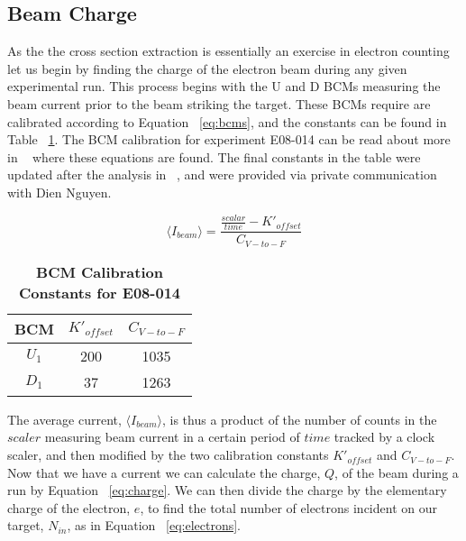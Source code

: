 \subsection{Beam Charge}
\label{ssec:charge}

As the the cross section extraction is essentially an exercise in electron counting let us begin by finding the charge of the electron beam during any given experimental run. This process begins with the U and D BCMs measuring the beam current prior to the beam striking the target. These BCMs require are calibrated according to Equation ~\ref{eq:bcms}, and the constants can be found in Table ~\ref{tab:bcm_constants}. The BCM calibration for experiment E08-014 can be read about more in ~\cite{bcm_calibration} where these equations are found. The final constants in the table were updated after the analysis in ~\cite{bcm_calibration}, and were provided via private communication with Dien Nguyen.

\begin{equation} \label{eq:bcms}
	\langle I_{beam} \rangle = \frac{\frac{scalar}{time}-K'_{offset}}{C_{V-to-F}}
\end{equation}

\begin{table}[!h]
\centering
\begin{tabular}{|c c c|}
\hline
\textbf{BCM} & \textbf{$K'_{offset}$} & \textbf{$C_{V-to-F}$} \\
\hline
$U_1$ & 200 & 1035 \\
$D_1$ & 37 & 1263\\
\hline
\end{tabular}
\caption{\bf{BCM Calibration Constants for E08-014}}
\label{tab:bcm_constants}
\end{table}

The average current, $\langle I_{beam} \rangle$, is thus a product of the number of counts in the $scaler$ measuring beam current in a certain period of $time$ tracked by a clock scaler, and then modified by the two calibration constants $K'_{offset}$ and $C_{V-to-F}$. Now that we have a current we can calculate the charge, $Q$, of the beam during a run by Equation ~\ref{eq:charge}. We can then divide the charge by the elementary charge of the electron, $e$, to find the total number of electrons incident on our target, $N_{in}$, as in Equation ~\ref{eq:electrons}.

